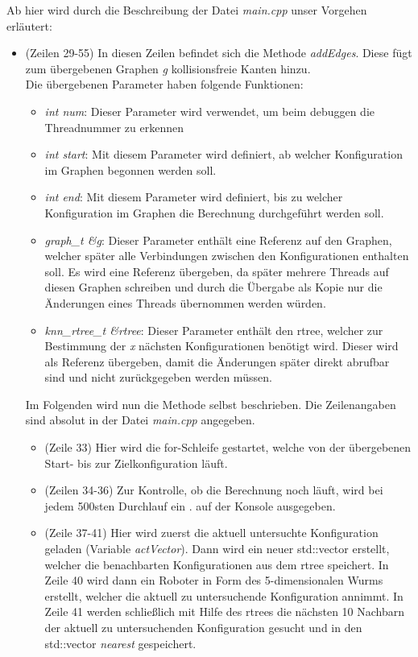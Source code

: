 \documentclass[a4paper]{scrartcl}
\begin{document}
Ab hier wird durch die Beschreibung der Datei \textit{main.cpp} unser Vorgehen erläutert:

\begin{itemize}
	\item (Zeilen 29-55) In diesen Zeilen befindet sich die Methode \textit{addEdges}. Diese fügt zum übergebenen Graphen \textit{g} kollisionsfreie Kanten hinzu.\\
	Die übergebenen Parameter haben folgende Funktionen:
	\begin{itemize}
		\item \textit{int num}: Dieser Parameter wird verwendet, um beim debuggen die Threadnummer zu erkennen
		\item \textit{int start}: Mit diesem Parameter wird definiert, ab welcher Konfiguration im Graphen begonnen werden soll.
		\item \textit{int end}: Mit diesem Parameter wird definiert, bis zu welcher Konfiguration im Graphen die Berechnung durchgeführt werden soll.
		\item \textit{graph\_t \&g}: Dieser Parameter enthält eine Referenz auf den Graphen, welcher später alle Verbindungen zwischen den Konfigurationen enthalten soll. Es wird eine Referenz übergeben, da später mehrere Threads auf diesen Graphen schreiben und durch die Übergabe als Kopie nur die Änderungen eines Threads übernommen werden würden.
		\item \textit{knn\_rtree\_t \&rtree}: Dieser Parameter enthält den rtree, welcher zur Bestimmung der \textit{x} nächsten Konfigurationen benötigt wird. Dieser wird als Referenz übergeben, damit die Änderungen später direkt abrufbar sind und nicht zurückgegeben werden müssen.\\
	\end{itemize}
	Im Folgenden wird nun die Methode selbst beschrieben. Die Zeilenangaben sind absolut in der Datei \textit{main.cpp} angegeben.
	\begin{itemize}
		\item (Zeile 33) Hier wird die for-Schleife gestartet, welche von der übergebenen Start- bis zur Zielkonfiguration läuft.
		\item (Zeilen 34-36) Zur Kontrolle, ob die Berechnung noch läuft, wird bei jedem 500sten Durchlauf ein . auf der Konsole ausgegeben.
		\item (Zeile 37-41) Hier wird zuerst die aktuell untersuchte Konfiguration geladen (Variable \textit{actVector}). Dann wird ein neuer std::vector erstellt, welcher die benachbarten Konfigurationen aus dem rtree speichert. In Zeile 40 wird dann ein Roboter in Form des 5-dimensionalen Wurms erstellt, welcher die aktuell zu untersuchende Konfiguration annimmt. In Zeile 41 werden schließlich mit Hilfe des rtrees die nächsten 10 Nachbarn der aktuell zu untersuchenden Konfiguration gesucht und in den std::vector \textit{nearest} gespeichert. 

\end{itemize}
\end{itemize}
\end{document}

